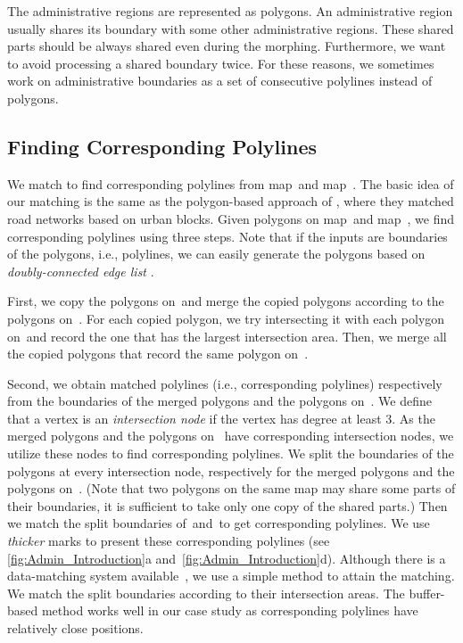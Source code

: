 The administrative regions are represented as polygons. 
An administrative region usually shares its boundary 
with some other administrative regions. 
These shared parts should be 
always shared even during the morphing.
Furthermore, we want to avoid processing a shared boundary twice.
For these reasons, we sometimes work on administrative boundaries
as a set of consecutive polylines instead of polygons.



\subsection{Finding Corresponding Polylines}
\label{sec:Admin_Preprocessing}

We match to find corresponding polylines 
from map~\ml and map~\ms.
The basic idea of our matching is the same as the polygon-based 
approach of \textcite{Fan2016Matching}, where they matched road 
networks based on urban blocks.
Given polygons on map~\ml and map~\ms, 
we find corresponding polylines using three steps. 
Note that if the inputs are boundaries of the polygons, 
i.e., polylines, 
we can easily generate the polygons 
based on \emph{doubly-connected edge list} 
\parencite[]{deBerg2008}.

First, we copy the polygons on~\ml and 
merge the copied polygons according to the polygons on~\ms. 
For each copied polygon, 
we try intersecting it with each polygon on~\ms and 
record the one that has the largest intersection area. 
Then, we merge all the copied 
polygons that record the same polygon on~\ms.

Second, we obtain matched polylines 
(i.e., corresponding polylines)
respectively from the boundaries of the 
merged polygons and the polygons on~\ms. 
We define that a vertex is an \emph{intersection node} 
if the vertex has degree at least 3. 
As the merged polygons and the polygons on~\ms 
have corresponding intersection nodes, 
we utilize these 
nodes to find corresponding polylines. 
We split the boundaries of the 
polygons at every intersection node, 
respectively for the merged polygons and the 
polygons on~\ms. 
(Note that two polygons on the same map may 
share some parts of their boundaries, 
it is sufficient to take only one copy of the shared parts.) 
Then we match the split boundaries of~\ml and~\ms to get 
corresponding polylines. 
We use \emph{thicker} marks to 
present these corresponding polylines 
(see \figs\ref{fig:Admin_Introduction}a
and~\ref{fig:Admin_Introduction}d). 
Although there is a data-matching 
system available~\parencite[see][]{Mustiere2008}, 
we use a simple method to attain the matching. 
We match the split boundaries 
according to their intersection areas. 
The buffer-based method works well in our case study as 
corresponding polylines have relatively close positions.

